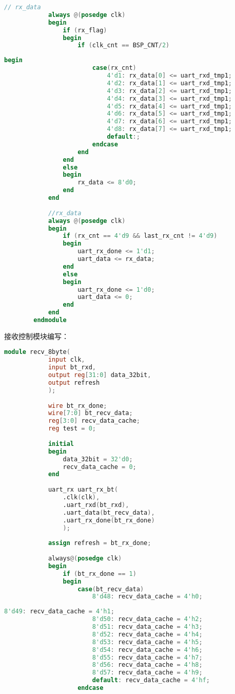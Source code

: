 {\begin{spacing}{1.5}
\begin{lstlisting}[language=Verilog]
			// rx_data
			always @(posedge clk)
			begin 
				if (rx_flag)
				begin
					if (clk_cnt == BSP_CNT/2)
		\end{lstlisting}
		\begin{lstlisting}[language=Verilog]
					begin 
						case(rx_cnt)
							4'd1: rx_data[0] <= uart_rxd_tmp1; 
							4'd2: rx_data[1] <= uart_rxd_tmp1; 
							4'd3: rx_data[2] <= uart_rxd_tmp1; 
							4'd4: rx_data[3] <= uart_rxd_tmp1; 
							4'd5: rx_data[4] <= uart_rxd_tmp1; 
							4'd6: rx_data[5] <= uart_rxd_tmp1; 
							4'd7: rx_data[6] <= uart_rxd_tmp1; 
							4'd8: rx_data[7] <= uart_rxd_tmp1;
							default:; 
						endcase
					end
				end
				else
				begin 
					rx_data <= 8'd0;
				end
			end
		
			//rx_data 
			always @(posedge clk)
			begin 
				if (rx_cnt == 4'd9 && last_rx_cnt != 4'd9)
				begin 
					uart_rx_done <= 1'd1;
					uart_data <= rx_data;
				end
				else 
				begin
					uart_rx_done <= 1'd0;  
					uart_data <= 0;
				end
			end
		endmodule
		\end{lstlisting}

		接收控制模块编写：

		\begin{lstlisting}[language=Verilog]
		module recv_8byte(
			input clk,
			input bt_rxd,
			output reg[31:0] data_32bit,
			output refresh
			);
		
			wire bt_rx_done;
			wire[7:0] bt_recv_data;
			reg[3:0] recv_data_cache;
			reg test = 0;
		
			initial
			begin
				data_32bit = 32'd0;
				recv_data_cache = 0;
			end
		
			uart_rx uart_rx_bt(
				.clk(clk),
				.uart_rxd(bt_rxd),
				.uart_data(bt_recv_data),
				.uart_rx_done(bt_rx_done)
				);
		
			assign refresh = bt_rx_done;
		
			always@(posedge clk)
			begin
				if (bt_rx_done == 1)
				begin
					case(bt_recv_data)
						8'd48: recv_data_cache = 4'h0;
		\end{lstlisting}
		\begin{lstlisting}[language=Verilog]
						8'd49: recv_data_cache = 4'h1;
						8'd50: recv_data_cache = 4'h2;
						8'd51: recv_data_cache = 4'h3;
						8'd52: recv_data_cache = 4'h4;
						8'd53: recv_data_cache = 4'h5;
						8'd54: recv_data_cache = 4'h6;
						8'd55: recv_data_cache = 4'h7;
						8'd56: recv_data_cache = 4'h8;
						8'd57: recv_data_cache = 4'h9;
						default: recv_data_cache = 4'hf;
					endcase
		

\end{lstlisting}
\end{spacing}}
